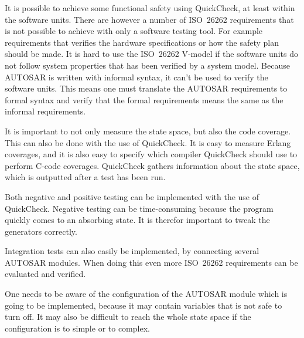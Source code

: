 It is possible to achieve some functional safety using QuickCheck, at
least within the software units. There are however a number of
ISO~26262 requirements that is not possible to achieve with only a
software testing tool. For example requirements that verifies the
hardware specifications or how the safety plan should be made. It is
hard to use the ISO~26262 V-model if the software units do
not follow system properties that has been verified by a system
model. Because AUTOSAR is written with informal syntax, it can't be
used to verify the software units. This means one must translate the
AUTOSAR requirements to formal syntax and verify that the formal
requirements means the same as the informal requirements.

It is important to not only measure the state space, but also the code
coverage. This can also be done with the use of QuickCheck. It is easy
to measure Erlang coverages, and it is also easy to specify which
compiler QuickCheck should use to perform C-code coverages.
QuickCheck gathers information about the state space, which is
outputted after a test has been run.

Both negative and positive testing can be implemented with the use of
QuickCheck. Negative testing can be time-consuming because the program
quickly comes to an absorbing state. It is therefor important to tweak
the generators correctly.

Integration tests can also easily be implemented, by connecting
several AUTOSAR modules. When doing this even more ISO~26262
requirements can be evaluated and verified.

One needs to be aware of the configuration of the AUTOSAR module which
is going to be implemented, because it may contain variables that is
not safe to turn off. It may also be difficult to reach the whole
state space if the configuration is to simple or to complex.